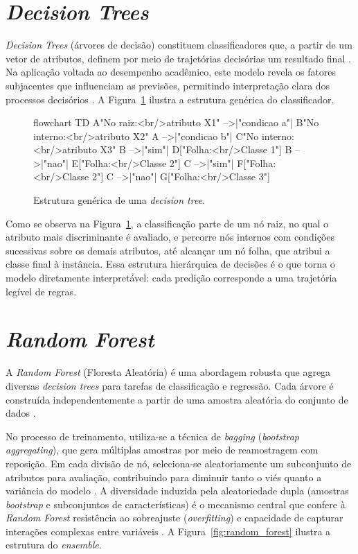 \section{\textit{Decision Trees}}

\textit{Decision Trees} (árvores de decisão) constituem classificadores que, a partir de um vetor de atributos, definem por meio de trajetórias decisórias um resultado final \cite{russel2013}. Na aplicação voltada ao desempenho acadêmico, este modelo revela os fatores subjacentes que influenciam as previsões, permitindo interpretação clara dos processos decisórios \cite{grus2016}. A Figura~\ref{fig:arvore_decisao} ilustra a estrutura genérica do classificador.

\begin{figure}[htb]
\centering
\caption{Estrutura genérica de uma \textit{decision tree}.}
\label{fig:arvore_decisao}
\begin{mermaid}[width=0.85\textwidth,keepaspectratio]
flowchart TD
  A{"No raiz:<br/>atributo X1"} -->|"condicao a"| B{"No interno:<br/>atributo X2"}
  A -->|"condicao b"| C{"No interno:<br/>atributo X3"}
  B -->|"sim"| D["Folha:<br/>Classe 1"]
  B -->|"nao"| E["Folha:<br/>Classe 2"]
  C -->|"sim"| F["Folha:<br/>Classe 2"]
  C -->|"nao"| G["Folha:<br/>Classe 3"]
\end{mermaid}
\end{figure}

Como se observa na Figura~\ref{fig:arvore_decisao}, a classificação parte de um nó raiz, no qual o atributo mais discriminante é avaliado, e percorre nós internos com condições sucessivas sobre os demais atributos, até alcançar um nó folha, que atribui a classe final à instância. Essa estrutura hierárquica de decisões é o que torna o modelo diretamente interpretável: cada predição corresponde a uma trajetória legível de regras.

\section{\textit{Random Forest}}

A \textit{Random Forest} (Floresta Aleatória) é uma abordagem robusta que agrega diversas \textit{decision trees} para tarefas de classificação e regressão. Cada árvore é construída independentemente a partir de uma amostra aleatória do conjunto de dados \cite{artero2009}.

No processo de treinamento, utiliza-se a técnica de \textit{bagging} (\textit{bootstrap aggregating}), que gera múltiplas amostras por meio de reamostragem com reposição. Em cada divisão de nó, seleciona-se aleatoriamente um subconjunto de atributos para avaliação, contribuindo para diminuir tanto o viés quanto a variância do modelo \cite{geron2019}. A diversidade induzida pela aleatoriedade dupla (amostras \textit{bootstrap} e subconjuntos de características) é o mecanismo central que confere à \textit{Random Forest} resistência ao sobreajuste (\textit{overfitting}) e capacidade de capturar interações complexas entre variáveis \cite{denisko2018}. A Figura~\ref{fig:random_forest} ilustra a estrutura do \textit{ensemble}.


